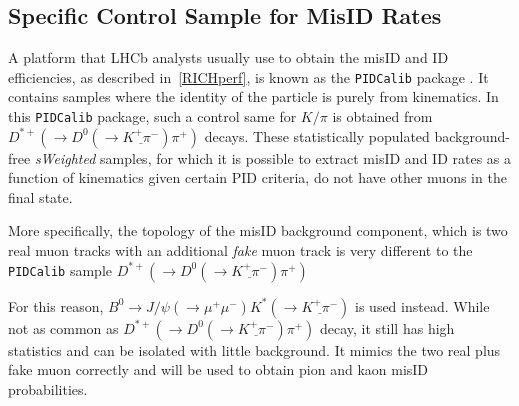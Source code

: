 \subsection{Specific Control Sample for  MisID Rates }
\label{extraction}
A platform that \gls{LHCb} analysts usually use to obtain the misID and ID efficiencies, as described in~\autoref{RICHperf}, is known as the \texttt{PIDCalib} package \cite{Anderlini:2202412}. It contains samples where the identity of the particle is \DIFdelbegin {}\DIFdelend \DIFaddbegin {}\DIFaddend purely from kinematics.  In this \texttt{PIDCalib} package, such a control same for $K/\pi$ is obtained from $D^{*+}(\rightarrow D^{0}(\rightarrow \underline{K^{+} \pi^{-}}) \pi^{+})$ decays. These statistically populated background-free \textit{sWeighted} samples\cite{sPlot}, for which it is possible to extract misID and ID rates as a function of kinematics given certain \gls{PID} criteria, do not have other muons in the final state. 

More specifically, the topology of the misID background component, which is two real muon tracks with an additional \textit{fake} muon track is very different to the \texttt{PIDCalib} sample $D^{*+}(\rightarrow D^{0}(\rightarrow \underline{K^{+} \pi^{-}}) \pi^{+})$\DIFdelbegin {}\DIFdelend \DIFaddbegin {}\DIFaddend 


For this reason, $B^{0} \rightarrow J/\psi(\rightarrow \mu^{+} \mu^{-}) K^{*}(\rightarrow \underline{K^{+} \pi^{-}})$ is used instead. While not as common as $D^{*+}(\rightarrow D^{0}(\rightarrow \underline{K^{+} \pi^{-}}) \pi^{+})$ decay, it still has high statistics and can be isolated with little background. It mimics the two real \DIFdelbegin {}\DIFdelend \DIFaddbegin {}\DIFaddend plus fake muon correctly and will be used to obtain pion and kaon misID probabilities.

